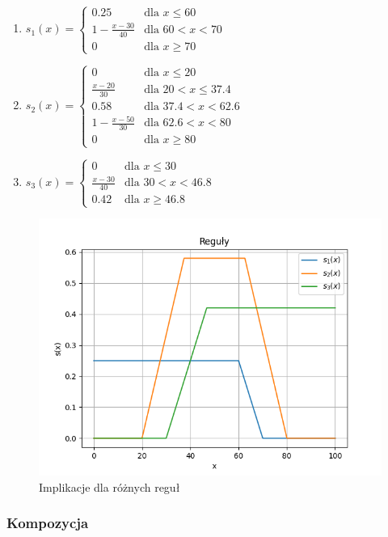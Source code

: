 \documentclass{article}
\begin{document}
\begin{enumerate}[label=Reguła \arabic*:, leftmargin=*]
    \item $s_1(x) = \begin{cases}
        0.25 & \text{dla } x \leq 60 \\
        1 - \frac{x - 30}{40} & \text{dla } 60 < x < 70 \\
        0 & \text{dla } x \geq 70
    \end{cases}$
    \item $s_2(x) = \begin{cases}
        0 & \text{dla } x \leq 20 \\
        \frac{x - 20}{30} & \text{dla } 20 < x \leq 37.4 \\
        0.58 & \text{dla } 37.4 < x < 62.6 \\
        1 - \frac{x - 50}{30} & \text{dla } 62.6 < x < 80 \\
        0 & \text{dla } x \geq 80
    \end{cases}$
    \item $s_3(x) = \begin{cases}
        0 & \text{dla } x \leq 30 \\
        \frac{x - 30}{40} & \text{dla } 30 < x < 46.8 \\
        0.42 & \text{dla } x \geq 46.8
    \end{cases}$
\end{enumerate}

\begin{figure}[H]
    \centering
    \includegraphics[width=0.8\linewidth]{Zad1/rules.png}
    \caption{Implikacje dla różnych reguł}
\end{figure}

\subsubsection*{Kompozycja}
\end{document}
